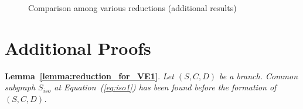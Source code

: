 \begin{figure}[]
	\caption{Comparison among various reductions (additional results)}
	\label{fig:appendix_all_vary_R}
\end{figure}

\section{Additional Proofs}



\smallskip
\noindent\textbf{Lemma~\ref{lemma:reduction_for_VE1}}. \emph{
    Let $(S,C,D)$ be a branch. Common subgraph $S_{iso}$ at Equation~(\ref{eq:iso1}) has been found before the formation of $(S,C,D)$.}

